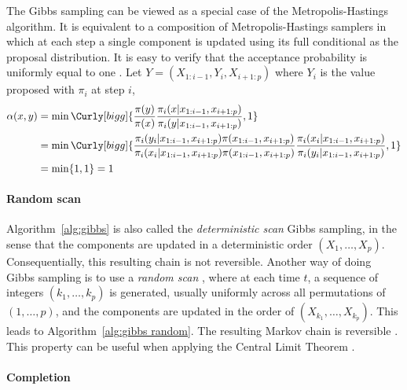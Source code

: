 The Gibbs sampling can be viewed as a special case of the Metropolis-Hastings
algorithm. It is equivalent to a composition of Metropolis-Hastings samplers
in which at each step a single component is updated using its full conditional
as the proposal distribution. It is easy to verify that the acceptance
probability is uniformly equal to one \cite[][Theorem~10.13]{Robert:2004tn}.
Let $Y = (X_{1:i-1},Y_i,X_{i+1:p})$ where $Y_i$ is the value proposed with
$\pi_i$ at step $i$,
\begin{align*}
  \alpha(x,y) &= \min\Curly[bigg]{
    \frac{\pi(y)}{\pi(x)}
    \frac{\pi_i(x|x_{1:i-1},x_{i+1:p})}{\pi_i(y|x_{1:i-1},x_{i+1:p})},1} \\
  &= \min\Curly[bigg]{
    \frac{\pi_i(y_i|x_{1:i-1}, x_{i+1:p})\pi(x_{1:i-1},x_{i+1:p})}
    {\pi_i(x_i|x_{1:i-1}, x_{i+1:p})\pi(x_{1:i-1},x_{i+1:p})}
    \frac{\pi_i(x_i|x_{1:i-1}, x_{i+1:p})}{\pi_i(y_i|x_{1:i-1}, x_{i+1:p})},1}
  \\
  &= \min\{1,1\} = 1
\end{align*}

\paragraph{Random scan}

Algorithm~\ref{alg:gibbs} is also called the \emph{deterministic scan} Gibbs
sampling, in the sense that the components are updated in a deterministic
order $(X_1,\dots,X_p)$. Consequentially, this resulting chain is not
reversible. Another way of doing Gibbs sampling is to use a \emph{random
scan} \cite{Liu1995Gibbs}, where at each time $t$, a sequence of integers
$(k_1,\dots,k_p)$ is generated, usually uniformly across all permutations of
$(1,\dots,p)$, and the components are updated in the order of
$(X_{k_1},\dots,X_{k_p})$. This leads to Algorithm~\ref{alg:gibbs random}.
The resulting Markov chain is reversible \cite{Liu1995Gibbs}. This property
can be useful when applying the Central Limit Theorem
\cite[][sec.~10.1.2]{Robert:2004tn}.



\paragraph{Completion}

